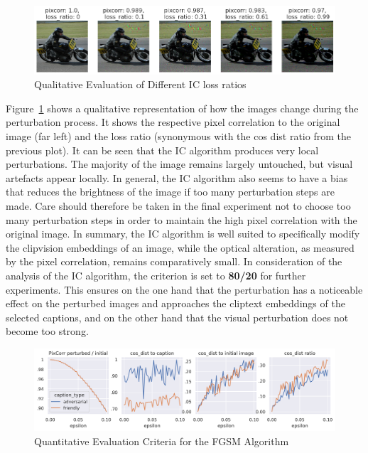 
\begin{figure}[ht]
    \centering
    \includegraphics[width=1\textwidth]{plots/advpert_ic_qual_validation_evolution.png}
    \caption{Qualitative Evaluation of Different IC loss ratios}\label{fig:advpert_ic_qual_validation_evolution}
\end{figure}

Figure~\ref{fig:advpert_ic_qual_validation_evolution} shows a qualitative representation of how the images change during the perturbation process. It shows the respective pixel correlation to the original image (far left) and the loss ratio (synonymous with the cos dist ratio from the previous plot). It can be seen that the IC algorithm produces very local perturbations. The majority of the image remains largely untouched, but visual artefacts appear locally. In general, the IC algorithm also seems to have a bias that reduces the brightness of the image if too many perturbation steps are made. Care should therefore be taken in the final experiment not to choose too many perturbation steps in order to maintain the high pixel correlation with the original image. In summary, the IC algorithm is well suited to specifically modify the clipvision embeddings of an image, while the optical alteration, as measured by the pixel correlation, remains comparatively small. In consideration of the analysis of the IC algorithm, the criterion is set to \textbf{80/20} for further experiments. This ensures on the one hand that the perturbation has a noticeable effect on the perturbed images and approaches the cliptext embeddings of the selected captions, and on the other hand that the visual perturbation does not become too strong. 


\begin{figure}[ht]
    \centering
    \includegraphics[width=1\textwidth]{plots/advpert_validation_fgsm_loss_curves.png}
    \caption{Quantitative Evaluation Criteria for the FGSM Algorithm}\label{fig:advpert_validation_fgsm_loss_curves}
\end{figure}

